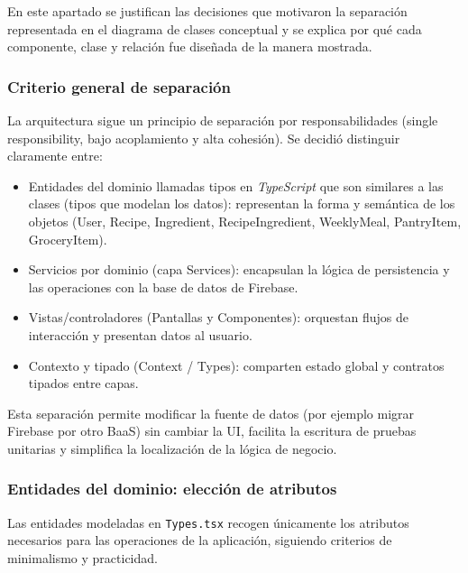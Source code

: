 \documentclass[twoside, openright, 11pt]{report}
\begin{document}
			En este apartado se justifican las decisiones que motivaron la separación representada en el diagrama de clases conceptual y se explica por qué cada componente, clase y relación fue diseñada de la manera mostrada.
			
			\subsubsection{Criterio general de separación}
				La arquitectura sigue un principio de separación por responsabilidades (single responsibility, bajo acoplamiento y alta cohesión). Se decidió distinguir claramente entre:
				\begin{itemize}
					\item Entidades del dominio llamadas tipos en \textit{TypeScript} que son similares a las clases (tipos que modelan los datos): representan la forma y semántica de los objetos (User, Recipe, Ingredient, RecipeIngredient, WeeklyMeal, PantryItem, GroceryItem).
					\item Servicios por dominio (capa Services): encapsulan la lógica de persistencia y las operaciones con la base de datos de Firebase.
					\item Vistas/controladores (Pantallas y Componentes): orquestan flujos de interacción y presentan datos al usuario.
					\item Contexto y tipado (Context / Types): comparten estado global y contratos tipados entre capas.
				\end{itemize}
				Esta separación permite modificar la fuente de datos (por ejemplo migrar Firebase por otro BaaS) sin cambiar la UI, facilita la escritura de pruebas unitarias y simplifica la localización de la lógica de negocio.
			
			\subsubsection{Entidades del dominio: elección de atributos}
				Las entidades modeladas en \texttt{Types.tsx} recogen únicamente los atributos necesarios para las operaciones de la aplicación, siguiendo criterios de minimalismo y practicidad.
			
\end{document}

